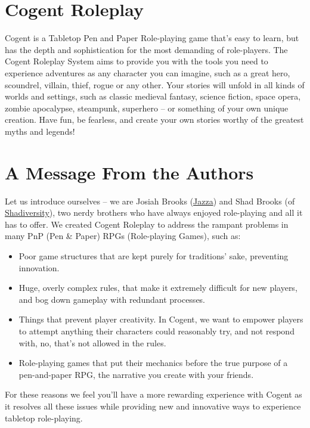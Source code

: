 \section{Cogent Roleplay} \label{sec:cogent_roleplay}

Cogent is a Tabletop Pen and Paper Role-playing game that’s easy to learn, but has the depth and sophistication for the most demanding of role-players. The Cogent Roleplay System aims to provide you with the tools you need to experience adventures as any character you can imagine, such as a great hero, scoundrel, villain, thief, rogue or any other. Your stories will unfold in all kinds of worlds and settings, such as classic medieval fantasy, science fiction, space opera, zombie apocalypse, steampunk, superhero – or something of your own unique creation. Have fun, be fearless, and create your own stories worthy of the greatest myths and legends!

\section{A Message From the Authors} \label{sec:message_from_authors}

Let us introduce ourselves – we are Josiah Brooks (\href{https://www.youtube.com/channel/UCHu2KNu6TtJ0p4hpSW7Yv7Q}{Jazza}) and Shad Brooks (of \href{https://www.youtube.com/channel/UCkmMACUKpQeIxN9D9ARli1Q}{Shadiversity}), two nerdy brothers who have always enjoyed role-playing and all it has to offer. We created Cogent Roleplay to address the rampant problems in many PnP (Pen \& Paper) RPGs (Role-playing Games), such as:

\begin{itemize}
    \item Poor game structures that are kept purely for traditions' sake, preventing innovation.
    \item Huge, overly complex rules, that make it extremely difficult for new players, and bog down gameplay with redundant processes.
    \item Things that prevent player creativity. In Cogent, we want to empower players to attempt anything their characters could reasonably try, and not respond with, no, that’s not allowed in the rules.
    \item Role-playing games that put their mechanics before the true purpose of a pen-and-paper RPG, the narrative you create with your friends.
\end{itemize}

For these reasons we feel you’ll have a more rewarding experience with Cogent as it resolves all these issues while providing new and innovative ways to experience tabletop role-playing.

